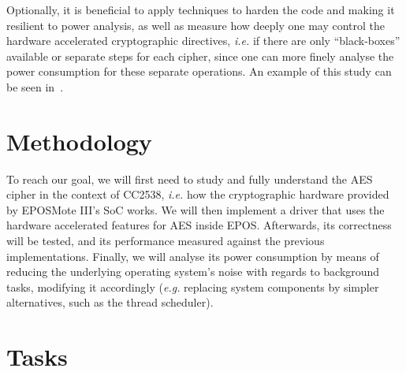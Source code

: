 \documentclass{../sftex/sftex}
\begin{document}
Optionally, it is beneficial to apply techniques to harden the code and making
it resilient to power analysis, as well as measure how deeply one may control
the hardware accelerated cryptographic directives, \emph{i.e.} if there are
only ``black-boxes'' available or separate steps for each cipher, since one can
more finely analyse the power consumption for these separate operations. An
example of this study can be seen in~\cite{Schwabe:inproc:2016:aug}.

\section{Methodology}

To reach our goal, we will first need to study and fully understand the AES
cipher in the context of CC2538, \emph{i.e.} how the cryptographic hardware
provided by EPOSMote III's SoC works. We will then implement a driver that uses
the hardware accelerated features for AES inside EPOS\@. Afterwards, its
correctness will be tested, and its performance measured against the previous
implementations. Finally, we will analyse its power consumption by means of
reducing the underlying operating system's noise with regards to background
tasks, modifying it accordingly (\emph{e.g.} replacing system components by
simpler alternatives, such as the thread scheduler).

\section{Tasks}
\end{document}
